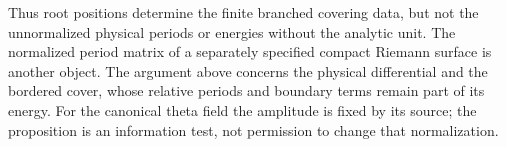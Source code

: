 Thus root positions determine the finite branched covering data, but not
the unnormalized physical periods or energies without the analytic unit.
The normalized period matrix of a separately specified compact Riemann
surface is another object. The argument above concerns the physical
differential and the bordered cover, whose relative periods and boundary
terms remain part of its energy. For the canonical theta field the
amplitude is fixed by its source; the proposition is an information
test, not permission to change that normalization.
